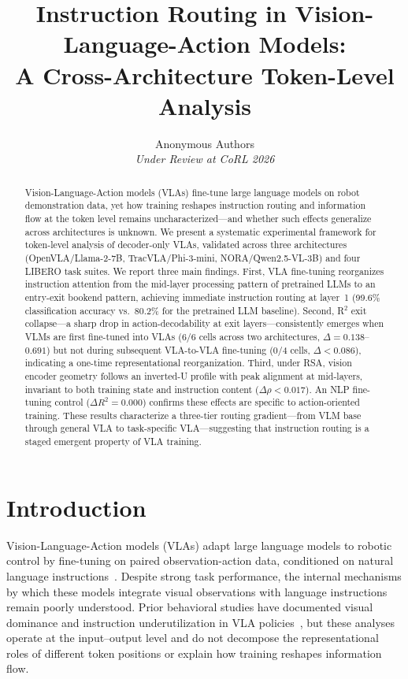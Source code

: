\documentclass[10pt,twocolumn]{article}
\title{Instruction Routing in Vision-Language-Action Models:\\A Cross-Architecture Token-Level Analysis}
\author{
  Anonymous Authors\\
  \textit{Under Review at CoRL 2026}
}
\date{}
\begin{document}
\maketitle

\begin{abstract}
Vision-Language-Action models (VLAs) fine-tune large language models on robot demonstration data, yet how training reshapes instruction routing and information flow at the token level remains uncharacterized---and whether such effects generalize across architectures is unknown.
We present a systematic experimental framework for token-level analysis of decoder-only VLAs, validated across three architectures (OpenVLA/Llama-2-7B, TracVLA/Phi-3-mini, NORA/Qwen2.5-VL-3B) and four LIBERO task suites.
We report three main findings.
First, VLA fine-tuning reorganizes instruction attention from the mid-layer processing pattern of pretrained LLMs to an entry-exit bookend pattern, achieving immediate instruction routing at layer~1 (99.6\% classification accuracy vs.\ 80.2\% for the pretrained LLM baseline).
Second, R$^2$ exit collapse---a sharp drop in action-decodability at exit layers---consistently emerges when VLMs are first fine-tuned into VLAs (6/6 cells across two architectures, $\Delta = 0.138$--$0.691$) but not during subsequent VLA-to-VLA fine-tuning (0/4 cells, $\Delta < 0.086$), indicating a one-time representational reorganization.
Third, under RSA, vision encoder geometry follows an inverted-U profile with peak alignment at mid-layers, invariant to both training state and instruction content ($\Delta\rho < 0.017$).
An NLP fine-tuning control ($\Delta R^2 = 0.000$) confirms these effects are specific to action-oriented training.
These results characterize a three-tier routing gradient---from VLM base through general VLA to task-specific VLA---suggesting that instruction routing is a staged emergent property of VLA training.
\end{abstract}

\section{Introduction}
\label{sec:intro}

Vision-Language-Action models (VLAs) adapt large language models to robotic control by fine-tuning on paired observation-action data, conditioned on natural language instructions~\citep{brohan2023rt2,kim2024openvla}.
Despite strong task performance, the internal mechanisms by which these models integrate visual observations with language instructions remain poorly understood.
Prior behavioral studies have documented visual dominance and instruction underutilization in VLA policies~\citep{grant2026behavioral,haon2025behavioral}, but these analyses operate at the input--output level and do not decompose the representational roles of different token positions or explain how training reshapes information flow.
\end{document}
